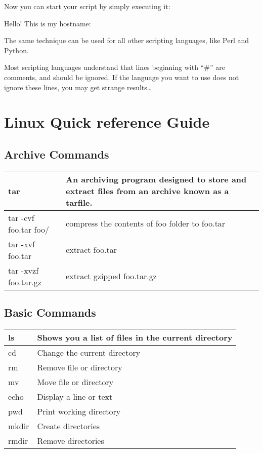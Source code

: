 Now you can start your script by simply executing it:

\begin{prompt}
Hello! This is my hostname:
\end{prompt}

The same technique can be used for all other scripting languages, like Perl and Python.

Most scripting languages understand that lines beginning with ``\#'' are
comments, and should be ignored. If the language you want to use does not
ignore these lines, you may get strange results\ldots

\section{Linux Quick reference Guide}

\subsection{Archive Commands}

\begin{tabular}{|p{}|p{}|} \hline
tar                   & An archiving program designed to store and extract files from an archive known as a tarfile.  \\ \hline
tar -cvf foo.tar foo/ & compress the contents of foo folder to foo.tar \\ \hline
tar -xvf foo.tar      & extract foo.tar \\ \hline
tar -xvzf foo.tar.gz  & extract gzipped foo.tar.gz \\ \hline
\end{tabular}


\subsection{Basic Commands}

\begin{tabular}{|p{}|p{}|} \hline
ls     & Shows you a list of files in the current directory \\ \hline
cd     & Change the current directory \\ \hline
rm     & Remove file or directory \\ \hline
mv     & Move file or directory \\ \hline
echo   & Display a line or text \\ \hline
pwd    & Print working directory \\ \hline
mkdir  & Create directories \\ \hline
rmdir  & Remove directories \\ \hline
\end{tabular}


